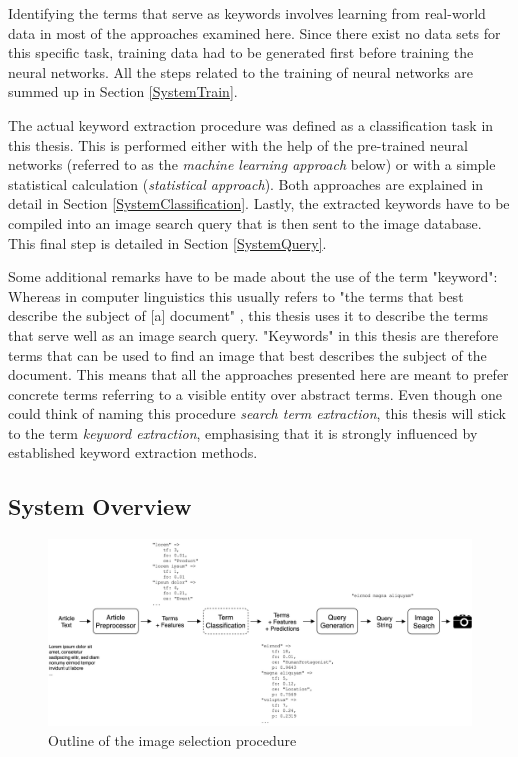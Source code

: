\documentclass[11pt,a4paper,twoside]{article}
\begin{document}
Identifying the terms that serve as keywords involves learning from real-world data in most of the approaches examined here. Since there exist no data sets for this specific task, training data had to be generated first before training the neural networks. All the steps related to the training of neural networks are summed up in Section \ref{SystemTrain}.

The actual keyword extraction procedure was defined as a classification task in this thesis. This is performed either with the help of the pre-trained neural networks (referred to as the \emph{machine learning approach} below) or with a simple statistical calculation (\emph{statistical approach}). Both approaches are explained in detail in Section \ref{SystemClassification}. Lastly, the extracted keywords have to be compiled into an image search query that is then sent to the image database. This final step is detailed in Section \ref{SystemQuery}.

Some additional remarks have to be made about the use of the term "keyword": Whereas in computer linguistics this usually refers to "the terms that best describe the subject of [a] document" \cite[p. 1]{BeligaKeywordApproaches}, this thesis uses it to describe the terms that serve well as an image search query. "Keywords" in this thesis are therefore terms that can be used to find an image that best describes the subject of the document. This means that all the approaches presented here are meant to prefer concrete terms referring to a visible entity over abstract terms. Even though one could think of naming this procedure \emph{search term extraction}, this thesis will stick to the term \emph{keyword extraction}, emphasising that it is strongly influenced by established keyword extraction methods.

\subsection{System Overview} \label{SystemOverview}

\begin{figure}[t]
  \includegraphics[width=\columnwidth]{picpic-overview.png}
  \caption{Outline of the image selection procedure}
  \label{fig:picpic-overview}
\end{figure}
\end{document}
